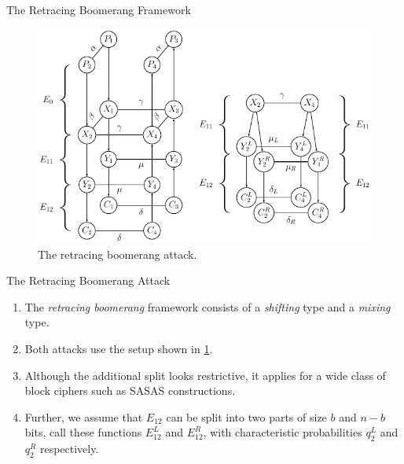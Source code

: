 \documentclass[notheorems]{beamer}
\theoremstyle{definition}
\theoremstyle{example}
\begin{document}
    \begin{frame}{The Retracing Boomerang Framework}
        \begin{figure}[!ht]
            \centering
            \includegraphics[width=0.6\columnwidth]{images/retracing_boomerang.png}
            \caption{The retracing boomerang attack.}
            \label{fig:retr-boomerang}
        \end{figure}
    \end{frame}

    \begin{frame}[<+->]{The Retracing Boomerang Attack}
        \begin{enumerate}
            \item The \emph{retracing boomerang} framework consists of a 
            \emph{shifting} type and a \emph{mixing} type.
            \item Both attacks use the setup shown in 
            \cref{fig:retr-boomerang}.
            \item Although the additional split looks restrictive, it applies 
            for a wide class of block ciphers such as SASAS constructions.
            \item Further, we assume that \(E_{12}\) can be split into two
            parts of size \(b\) and \(n - b\) bits, call these functions 
            \(E_{12}^L\) and \(E_{12}^R\), with characteristic probabilities
            \(q_2^L\) and \(q_2^R\) respectively.
        \end{enumerate}
    \end{frame}
\end{document}
